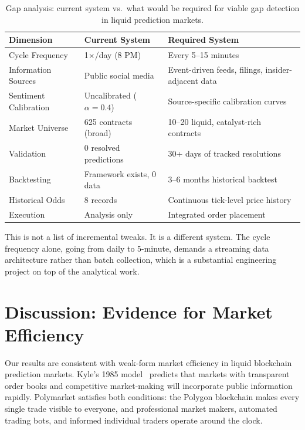 \documentclass[conference]{IEEEtran}
\begin{document}
\begin{table}[H]
\centering
\caption{Gap analysis: current system vs.\ what would be required for viable gap detection in liquid prediction markets.}
\label{tab:gap_analysis}
\begin{tabular}{@{}p{2.0cm}p{2.7cm}p{2.7cm}@{}}
\toprule
\textbf{Dimension} & \textbf{Current System} & \textbf{Required System} \\
\midrule
Cycle Frequency & 1$\times$/day (8 PM) & Every 5--15 minutes \\
Information Sources & Public social media & Event-driven feeds, filings, insider-adjacent data \\
Sentiment Calibration & Uncalibrated ($\alpha = 0.4$) & Source-specific calibration curves \\
Market Universe & 625 contracts (broad) & 10--20 liquid, catalyst-rich contracts \\
Validation & 0 resolved predictions & 30+ days of tracked resolutions \\
Backtesting & Framework exists, 0 data & 3--6 months historical backtest \\
Historical Odds & 8 records & Continuous tick-level price history \\
Execution & Analysis only & Integrated order placement \\
\bottomrule
\end{tabular}
\end{table}

This is not a list of incremental tweaks. It is a different system. The cycle frequency alone, going from daily to 5-minute, demands a streaming data architecture rather than batch collection, which is a substantial engineering project on top of the analytical work.

\section{Discussion: Evidence for Market Efficiency}

Our results are consistent with weak-form market efficiency in liquid blockchain prediction markets. Kyle's 1985 model~\cite{kyle1985} predicts that markets with transparent order books and competitive market-making will incorporate public information rapidly. Polymarket satisfies both conditions: the Polygon blockchain makes every single trade visible to everyone, and professional market makers, automated trading bots, and informed individual traders operate around the clock.
\end{document}
